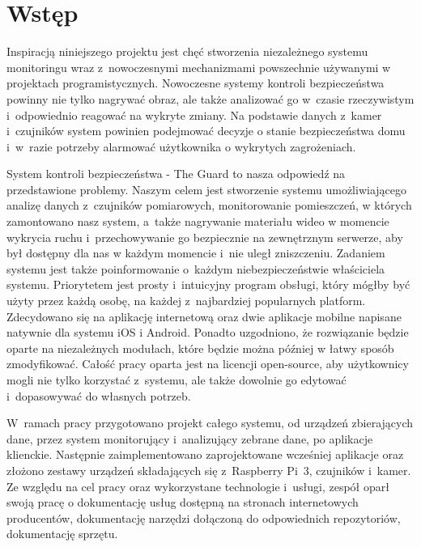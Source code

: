 \chapter{Wstęp}
Inspiracją niniejszego projektu jest chęć stworzenia niezależnego systemu monitoringu wraz z~nowoczesnymi mechanizmami powszechnie używanymi w projektach programistycznych.
Nowoczesne systemy kontroli bezpieczeństwa powinny nie tylko nagrywać obraz, ale także analizować go w~czasie rzeczywistym i~odpowiednio reagować na wykryte zmiany. Na podstawie danych z~kamer i~czujników system powinien podejmować decyzje o stanie bezpieczeństwa domu i~w~razie potrzeby alarmować użytkownika o wykrytych zagrożeniach.

System kontroli bezpieczeństwa - The Guard to nasza odpowiedź na przedstawione problemy. Naszym celem jest stworzenie systemu umożliwiającego analizę danych z~czujników pomiarowych, monitorowanie pomieszczeń, w których zamontowano nasz system, a~także nagrywanie materiału wideo w momencie wykrycia ruchu i~przechowywanie go bezpiecznie na zewnętrznym serwerze, aby był dostępny dla nas w każdym momencie i~nie uległ zniszczeniu. Zadaniem systemu jest także poinformowanie o~każdym niebezpieczeństwie właściciela systemu. Priorytetem jest prosty i~intuicyjny program obsługi, który mógłby być użyty przez każdą osobę, na każdej z~najbardziej popularnych platform. Zdecydowano się na aplikację internetową oraz dwie aplikacje mobilne napisane natywnie dla systemu iOS i Android. Ponadto uzgodniono, że rozwiązanie będzie oparte na niezależnych modułach, które będzie można później w łatwy sposób zmodyfikować. Całość pracy oparta jest na licencji open-source, aby użytkownicy mogli nie tylko korzystać z~systemu, ale także dowolnie go edytować i~dopasowywać do własnych potrzeb.

W~ramach pracy przygotowano projekt całego systemu, od urządzeń zbierających dane, przez system monitorujący i~analizujący zebrane dane, po aplikacje klienckie. Następnie zaimplementowano zaprojektowane wcześniej aplikacje oraz złożono zestawy urządzeń składających się z~Raspberry Pi~3, czujników i~kamer.
Ze względu na cel pracy oraz wykorzystane technologie i~usługi, zespół oparł swoją pracę o dokumentację usług dostępną na stronach internetowych producentów, dokumentację narzędzi dołączoną do odpowiednich repozytoriów, dokumentację sprzętu.

